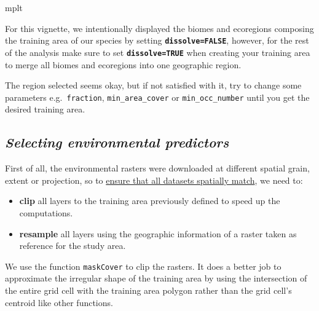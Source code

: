 \documentclass[
]{article}
\newenvironment{Shaded}{\begin{snugshade}}{\end{snugshade}}
\newcommand{\NormalTok}[1]{#1}
\begin{document}
\begin{Shaded}
\begin{Highlighting}[]
\NormalTok{mplt}
\end{Highlighting}
\end{Shaded}

\begin{warningbox}
For this vignette, we intentionally displayed the biomes and ecoregions
composing the training area of our species by setting
\textbf{\texttt{dissolve=FALSE}}, however, for the rest of the analysis
make sure to set \textbf{\texttt{dissolve=TRUE}} when creating your
training area to merge all biomes and ecoregions into one geographic
region.

\end{warningbox}

The region selected seems okay, but if not satisfied with it, try to
change some parameters e.g.~\texttt{fraction}, \texttt{min\_area\_cover}
or \texttt{min\_occ\_number} until you get the desired training area.

\hypertarget{selecting-environmental-predictors}{%
\subsection{\texorpdfstring{\emph{Selecting environmental
predictors}}{Selecting environmental predictors}}\label{selecting-environmental-predictors}}

First of all, the environmental rasters were downloaded at different
spatial grain, extent or projection, so to
\underline{ensure that all datasets spatially match}, we need to:

\begin{itemize}
\item
  \textbf{clip} all layers to the training area previously defined to
  speed up the computations.
\item
  \textbf{resample} all layers using the geographic information of a
  raster taken as reference for the study area.
\end{itemize}

We use the function \texttt{maskCover} to clip the rasters. It does a
better job to approximate the irregular shape of the training area by
using the intersection of the entire grid cell with the training area
polygon rather than the grid cell's centroid like other functions.
\end{document}
